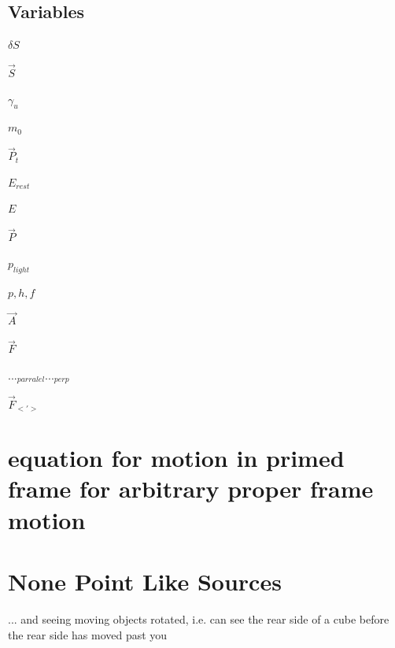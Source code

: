 \section{Variables}

$\delta S$ \newline

$\vec{S}$ \newline

$\gamma_u$ \newline

$m_0$ \newline

$\vec{P}_t$ \newline

$E_{rest}$ \newline

$E$ \newline

$\vec{P}$ \newline

$p_{light}$ \newline

$p, h, f$ \newline

$\vec{A}$ \newline

$\vec{F}$ \newline

$..._{parralel} ..._{perp}$ \newline

$\vec{F}_{<'>}$ \newline

\chapter{equation for motion in primed frame for arbitrary proper frame motion}

\chapter{None Point Like Sources}
... and seeing moving objects rotated, i.e. can see the rear side of a cube before the rear side has moved past you

